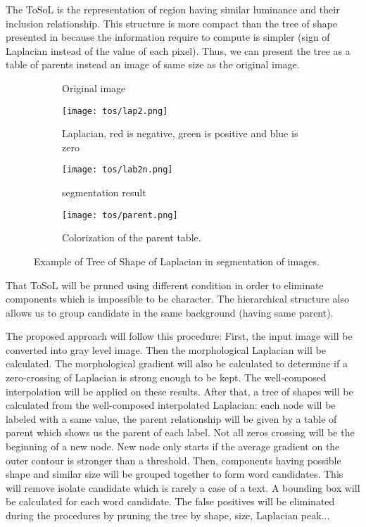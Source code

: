 \par
The ToSoL is the representation of region having similar luminance and their inclusion relationship. This structure is more compact than the tree of shape presented in \cite{geraud.13.ismm} because the information require to compute is simpler (sign of Laplacian instead of the value of each pixel). Thus, we can present the tree as a table of parents instead an image of same size as the original image. 

\begin{figure}
	\centering
	\begin{subfigure}[t]{2in}
		\centering
	 	 \caption{Original image}\label{fig:tosOri} \end{subfigure}   
	\begin{subfigure}[t]{2in}
		\centering
	 	\texttt{[image: tos/lap2.png]} \caption{Laplacian, red is negative, green is positive and blue is zero}\label{fig:tosLap} \end{subfigure}   
	\begin{subfigure}[t]{2in}
		\centering
		\texttt{[image: tos/lab2n.png]} \caption{segmentation result}\label{fig:tosLab} \end{subfigure}
	\centering
		
	\begin{subfigure}[t]{2in}
		\centering
		\texttt{[image: tos/parent.png]} 
		\caption{Colorization of the parent table.}\label{fig:tosParent} \end{subfigure}					
	\centering
	\caption[Example of \textit{Tree of Shape of Laplacian}] {Example of Tree of Shape of Laplacian in segmentation of images.  }
	\label{fig:ToS}
\end{figure}

\par That ToSoL will be pruned using different condition in order to eliminate components which is impossible to be character. The hierarchical structure also allows us to group candidate in the same background (having same parent). 

\par The proposed approach will follow this procedure: First, the input image will be converted into gray level image. Then the morphological Laplacian will be calculated. The morphological gradient will also be calculated to determine if a zero-crossing of Laplacian is strong enough to be kept. The well-composed interpolation will be applied on these results. After that, a tree of shapes will be calculated from the well-composed interpolated Laplacian: each node will be labeled with a same value, the parent relationship will be given by a table of parent which shows us the parent of each label. Not all zeros crossing will be the beginning of a new node. New node only starts if the average gradient on the outer contour is stronger than a threshold. Then, components having possible shape and similar size will be grouped together to form word candidates. This will remove isolate candidate which is rarely a case of a text. A bounding box will be calculated for each word candidate. The false positives will be eliminated during the procedures by pruning the tree by shape, size, Laplacian peak...

